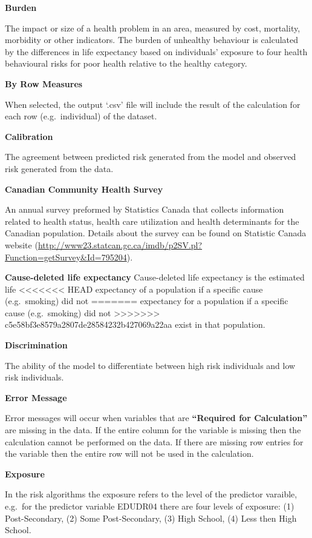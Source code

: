 \documentclass[]{book}
\begin{document}
\textbf{Burden}

The impact or size of a health problem in an area, measured by cost,
mortality, morbidity or other indicators. The burden of unhealthy
behaviour is calculated by the differences in life expectancy based on
individuals' exposure to four health behavioural risks for poor health
relative to the healthy category.

\textbf{By Row Measures}

When selected, the output `.csv' file will include the result of the
calculation for each row (e.g.~individual) of the dataset.

\textbf{Calibration}

The agreement between predicted risk generated from the model and
observed risk generated from the data.

\textbf{Canadian Community Health Survey}

An annual survey preformed by Statistics Canada that collects
information related to health status, health care utilization and health
determinants for the Canadian population. Details about the survey can
be found on Statistic Canada website
(\url{http://www23.statcan.gc.ca/imdb/p2SV.pl?Function=getSurvey\&Id=795204}).

\textbf{Cause-deleted life expectancy} Cause-deleted life expectancy is the estimated life
<<<<<<< HEAD
expectancy of a population if a specific cause (e.g.~smoking) did not
=======
expectancy for a population if a specific cause (e.g.~smoking) did not
>>>>>>> c5e58bf3e8579a2807de28584232b427069a22aa
exist in that population.

\textbf{Discrimination}

The ability of the model to differentiate between high risk individuals
and low risk individuals.

\textbf{Error Message}

Error messages will occur when variables that are \textbf{``Required for
Calculation''} are missing in the data. If the entire column for the
variable is missing then the calculation cannot be performed on the
data. If there are missing row entries for the variable then the entire
row will not be used in the calculation.

\textbf{Exposure}

In the risk algorithms the exposure refers to the level of the predictor
varaible, e.g.~for the predictor variable EDUDR04 there are four levels
of exposure: (1) Post-Secondary, (2) Some Post-Secondary, (3) High
School, (4) Less then High School.
\end{document}
